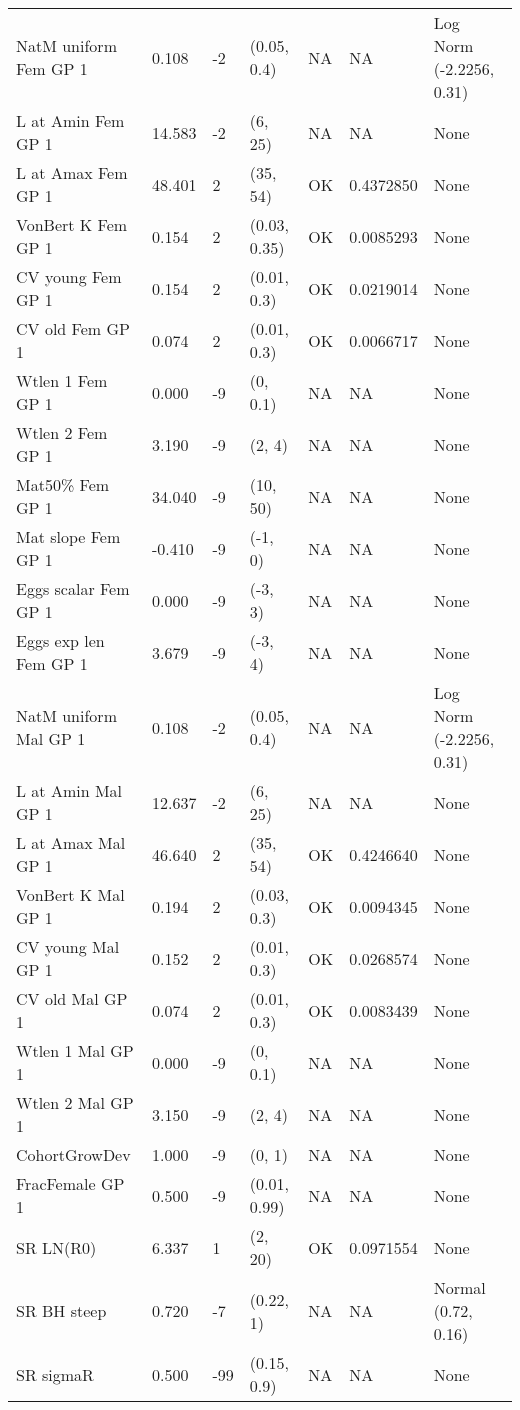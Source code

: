 \documentclass[11pt,
  english,
  letterpaper,
]{article}
\begin{document}
\begin{landscape}
\begin{longtable}[t]{>{\raggedright\arraybackslash}p{7cm}lllll>{\raggedright\arraybackslash}p{4cm}}
\endfoot
\bottomrule
\endlastfoot
NatM uniform Fem GP 1 & 0.108 & -2 & (0.05, 0.4) & NA & NA & Log Norm (-2.2256, 0.31)\\
L at Amin Fem GP 1 & 14.583 & -2 & (6, 25) & NA & NA & None\\
L at Amax Fem GP 1 & 48.401 & 2 & (35, 54) & OK & 0.4372850 & None\\
VonBert K Fem GP 1 & 0.154 & 2 & (0.03, 0.35) & OK & 0.0085293 & None\\
CV young Fem GP 1 & 0.154 & 2 & (0.01, 0.3) & OK & 0.0219014 & None\\
CV old Fem GP 1 & 0.074 & 2 & (0.01, 0.3) & OK & 0.0066717 & None\\
Wtlen 1 Fem GP 1 & 0.000 & -9 & (0, 0.1) & NA & NA & None\\
Wtlen 2 Fem GP 1 & 3.190 & -9 & (2, 4) & NA & NA & None\\
Mat50\% Fem GP 1 & 34.040 & -9 & (10, 50) & NA & NA & None\\
Mat slope Fem GP 1 & -0.410 & -9 & (-1, 0) & NA & NA & None\\
Eggs scalar Fem GP 1 & 0.000 & -9 & (-3, 3) & NA & NA & None\\
Eggs exp len Fem GP 1 & 3.679 & -9 & (-3, 4) & NA & NA & None\\
NatM uniform Mal GP 1 & 0.108 & -2 & (0.05, 0.4) & NA & NA & Log Norm (-2.2256, 0.31)\\
L at Amin Mal GP 1 & 12.637 & -2 & (6, 25) & NA & NA & None\\
L at Amax Mal GP 1 & 46.640 & 2 & (35, 54) & OK & 0.4246640 & None\\
VonBert K Mal GP 1 & 0.194 & 2 & (0.03, 0.3) & OK & 0.0094345 & None\\
CV young Mal GP 1 & 0.152 & 2 & (0.01, 0.3) & OK & 0.0268574 & None\\
CV old Mal GP 1 & 0.074 & 2 & (0.01, 0.3) & OK & 0.0083439 & None\\
Wtlen 1 Mal GP 1 & 0.000 & -9 & (0, 0.1) & NA & NA & None\\
Wtlen 2 Mal GP 1 & 3.150 & -9 & (2, 4) & NA & NA & None\\
CohortGrowDev & 1.000 & -9 & (0, 1) & NA & NA & None\\
FracFemale GP 1 & 0.500 & -9 & (0.01, 0.99) & NA & NA & None\\
SR LN(R0) & 6.337 & 1 & (2, 20) & OK & 0.0971554 & None\\
SR BH steep & 0.720 & -7 & (0.22, 1) & NA & NA & Normal (0.72, 0.16)\\
SR sigmaR & 0.500 & -99 & (0.15, 0.9) & NA & NA & None\\

\end{longtable}
\end{landscape}
\end{document}
